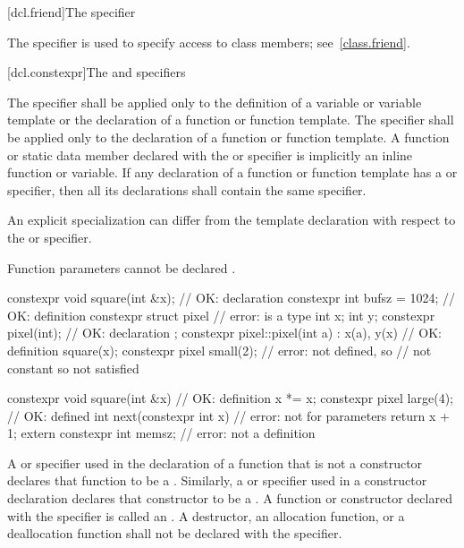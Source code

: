 [dcl.friend]{The  specifier}%

\pnum
The  specifier is used to specify access to class members;
see~\ref{class.friend}.

[dcl.constexpr]{The  and  specifiers}%

\pnum
The  specifier shall be applied only to
the definition of a variable or variable template or
the declaration of a function or function template.
The  specifier shall be applied only to
the declaration of a function or function template.
A function or static data member
declared with the  or  specifier
is implicitly an inline function or variable.
If any declaration of a function or function template has
a  or  specifier,
then all its declarations shall contain the same specifier.
\begin{note}
An explicit specialization can differ from the template declaration
with respect to the  or  specifier.
\end{note}
\begin{note}
Function parameters cannot be declared .\end{note}
\begin{example}
\begin{codeblock}
constexpr void square(int &x);  // OK: declaration
constexpr int bufsz = 1024;     // OK: definition
constexpr struct pixel {        // error:  is a type
  int x;
  int y;
  constexpr pixel(int);         // OK: declaration
};
constexpr pixel::pixel(int a)
  : x(a), y(x)                  // OK: definition
  { square(x); }
constexpr pixel small(2);       // error:  not defined, so 
                                // not constant so  not satisfied

constexpr void square(int &x) { // OK: definition
  x *= x;
}
constexpr pixel large(4);       // OK:  defined
int next(constexpr int x) {     // error: not for parameters
     return x + 1;
}
extern constexpr int memsz;     // error: not a definition
\end{codeblock}
\end{example}

\pnum
A  or  specifier
used in the declaration of a function that is not a constructor
declares that function to be
a .
Similarly, a  or  specifier used in
a constructor declaration declares that constructor to be
a .
A function or constructor declared with the  specifier
is called an .
A destructor, an allocation function, or a deallocation function
shall not be declared with the  specifier.

